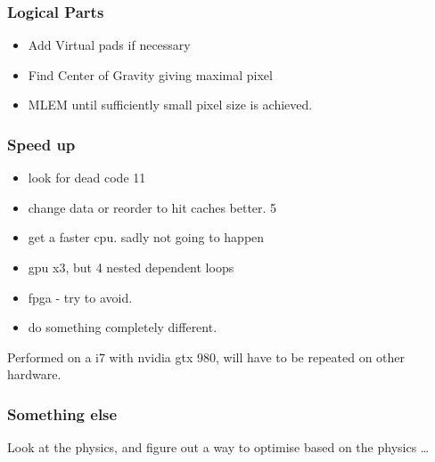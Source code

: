 \documentclass{beamer}
\begin{document}
\begin{frame}
  \frametitle{Logical Parts}
  \begin{itemize}
    \item Add Virtual pads if necessary  
    \item Find Center of Gravity giving maximal pixel
    \item MLEM until sufficiently small pixel size is achieved.
  \end{itemize}
\end{frame}

\begin{frame}
  \frametitle{Speed up}
\begin{itemize}
  \item look for dead code 11%
  \item change data or reorder to hit caches better. 5%
  \item get a faster cpu. sadly not going to happen 
  \item gpu x3, but 4 nested dependent loops
  \item fpga - try to avoid.
  \item do something completely different.
\end{itemize}
Performed on a i7 with nvidia gtx 980, will have to be repeated on other hardware.
\end{frame}

\begin{frame}
\frametitle{Something else}
Look at the physics, and figure out a way to optimise based on the physics \ldots
\end{frame}
\end{document}

